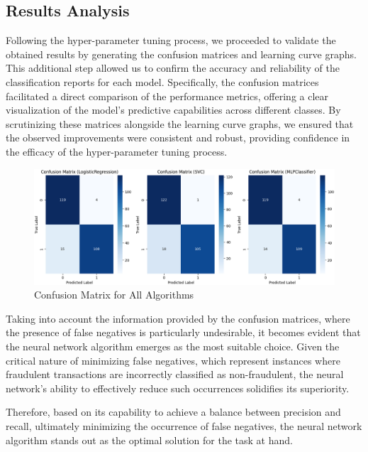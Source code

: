 \documentclass[conference]{IEEEtran}
\begin{document}
\subsection{Results Analysis}

Following the hyper-parameter tuning process, we proceeded to validate the obtained results by generating the confusion matrices and learning curve graphs. This additional step allowed us to confirm the accuracy and reliability of the classification reports for each model. Specifically, the confusion matrices facilitated a direct comparison of the performance metrics, offering a clear visualization of the model's predictive capabilities across different classes. By scrutinizing these matrices alongside the learning curve graphs, we ensured that the observed improvements were consistent and robust, providing confidence in the efficacy of the hyper-parameter tuning process.

\begin{figure}[H]
    \centering
    \includegraphics[width=1\linewidth]{images/ConfusionMatrixAll.png}
    \caption{Confusion Matrix for All Algorithms}
    \label{fig:NN-Confusion-AllFeatures}
\end{figure}

Taking into account the information provided by the confusion matrices, where the presence of false negatives is particularly undesirable, it becomes evident that the neural network algorithm emerges as the most suitable choice. Given the critical nature of minimizing false negatives, which represent instances where fraudulent transactions are incorrectly classified as non-fraudulent, the neural network's ability to effectively reduce such occurrences solidifies its superiority.

Therefore, based on its capability to achieve a balance between precision and recall, ultimately minimizing the occurrence of false negatives, the neural network algorithm stands out as the optimal solution for the task at hand.
\end{document}
